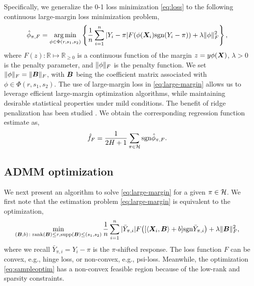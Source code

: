 \documentclass[aos]{imsart}
\theoremstyle{definition}
\def\sign{\textup{sgn}}
\def\rank{\textup{rank}}
\begin{document}
Specifically, we generalize the 0-1 loss minimization \eqref{eq:loss} to the following continuous large-margin loss minimization problem, 
\begin{align}\label{eq:large-margin}
\hat \phi_{\pi, F} = \argmin_{\phi \in\Phi(r,s_1,s_2)}\left\{ {1\over n}\sum_{i=1}^n |Y_i-\pi|F(\phi(\mX_i)\sign(Y_i-\pi))+ \lambda \FnormSize{}{\phi}^2\right\},
\end{align}
where $F(z)\colon \mathbb{R}\mapsto \mathbb{R}_{\geq 0}$ is a continuous function of the margin $z=y\phi(\bm X)$, $\lambda>0$ is the penalty parameter, and $\lVert\phi\rVert_F$ is the penalty function. We set $\lVert\phi\rVert_F=\lVert\bm B\rVert_F$, with $\bm B$ being the coefficient matrix associated with $\phi\in\Phi(r,s_1,s_2)$. The use of large-margin loss in \eqref{eq:large-margin} allows us to leverage efficient large-margin optimization algorithms, while maintaining desirable statistical properties under mild conditions. The benefit of ridge penalization has been studied \cite{shen2003psi}. We obtain the corresponding regression function estimate as, 
\begin{equation}\label{eq:stepfunction-large-margin}
\hat f_{F} = {1\over 2H+1}\sum_{\pi \in \tH} \sign \hat \phi_{\pi, F}.
\end{equation}



\subsection{ADMM optimization}

We next present an algorithm to solve \eqref{eq:large-margin} for a given $\pi\in\mathcal{H}$. We first note that the estimation problem \eqref{eq:large-margin} is equivalent to the optimization,
\begin{equation}\label{eq:sampleoptim}
\min_{\substack{(\mB,b)\colon  \rank(\mB)\leq r, \text{supp}(\mB)\leq (s_1,s_2)}}{1\over n}\sum_{i=1}^n|\bar Y_{\pi, i}| F\big( [\langle \mX_i,\mB \rangle+b] \sign \bar Y_{\pi, i}\big) + \lambda\FnormSize{}{\mB}^2,
\end{equation}
where we recall $\bar Y_{\pi, i}=Y_i-\pi$ is the $\pi$-shifted response. The loss function $F$ can be convex, e.g., hinge loss, or non-convex, e.g., psi-loss. Meanwhile, the optimization \eqref{eq:sampleoptim} has a non-convex feasible region because of the low-rank and sparsity constraints. 
\end{document}
